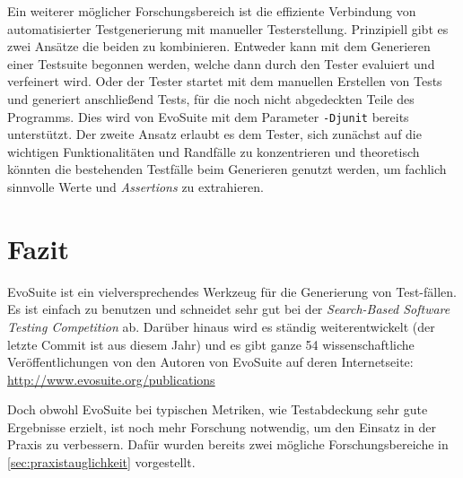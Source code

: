 \documentclass[a4paper,11pt]{article}
\begin{document}
Ein weiterer möglicher Forschungsbereich ist die effiziente Verbindung von automatisierter Testgenerierung mit manueller Testerstellung.
Prinzipiell gibt es zwei Ansätze die beiden zu kombinieren.
Entweder kann mit dem Generieren einer Testsuite begonnen werden, welche dann durch den Tester evaluiert und verfeinert wird.
Oder der Tester startet mit dem manuellen Erstellen von Tests und generiert anschließend Tests, für die noch nicht abgedeckten Teile des Programms.
Dies wird von EvoSuite mit dem Parameter \texttt{-Djunit} bereits unterstützt.
Der zweite Ansatz erlaubt es dem Tester, sich zunächst auf die wichtigen Funktionalitäten und Randfälle zu konzentrieren und theoretisch könnten die bestehenden Testfälle beim Generieren genutzt werden, um fachlich sinnvolle Werte und \textit{Assertions} zu extrahieren.

\section{Fazit}

EvoSuite ist ein vielversprechendes Werkzeug für die Generierung von Test-fällen.
Es ist einfach zu benutzen und schneidet sehr gut bei der \textit{Search-Based Software Testing Competition} ab.
Darüber hinaus wird es ständig weiterentwickelt (der letzte Commit ist aus diesem Jahr) und es gibt ganze 54 wissenschaftliche Veröffentlichungen von den Autoren von EvoSuite auf deren Internetseite: \url{http://www.evosuite.org/publications}

Doch obwohl EvoSuite bei typischen Metriken, wie Testabdeckung sehr gute Ergebnisse erzielt, ist noch mehr Forschung notwendig, um den Einsatz in der Praxis zu verbessern.
Dafür wurden bereits zwei mögliche Forschungsbereiche in \cref{sec:praxistauglichkeit} vorgestellt.



\end{document}
